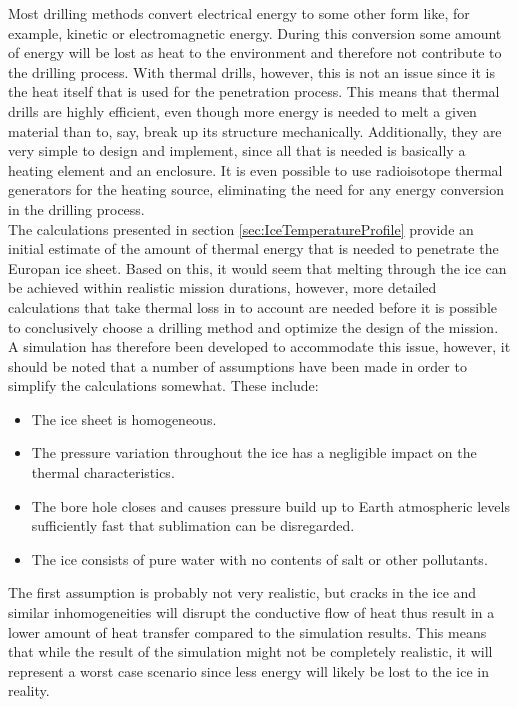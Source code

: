 \label{sec:temp_simulation}
Most drilling methods convert electrical energy to some other form like, for example, kinetic or electromagnetic energy. During this conversion some amount of energy will be lost as heat to the environment and therefore not contribute to the drilling process. With thermal drills, however, this is not an issue since it is the heat itself that is used for the penetration process. This means that thermal drills are highly efficient, even though more energy is needed to melt a given material than to, say, break up its structure mechanically. Additionally, they are very simple to design and implement, since all that is needed is basically a heating element and an enclosure. It is even possible to use radioisotope thermal generators for the heating source, eliminating the need for any energy conversion in the drilling process.\\

\noindent
The calculations presented in section \ref{sec:IceTemperatureProfile} provide an initial estimate of the amount of thermal energy that is needed to penetrate the Europan ice sheet. Based on this, it would seem that melting through the ice can be achieved within realistic mission durations, however, more detailed calculations that take thermal loss in to account are needed before it is possible to conclusively choose a drilling method and optimize the design of the mission. \\

\noindent
A simulation has therefore been developed to accommodate this issue, however, it should be noted that a number of assumptions have been made in order to simplify the calculations somewhat. These include:
\begin{itemize}
	\item The ice sheet is homogeneous.
	\item The pressure variation throughout the ice has a negligible impact on the thermal characteristics.
	\item The bore hole closes and causes pressure build up to Earth atmospheric levels sufficiently fast that sublimation can be disregarded.
	\item The ice consists of pure water with no contents of salt or other pollutants.
\end{itemize}
The first assumption is probably not very realistic, but cracks in the ice and similar inhomogeneities will disrupt the conductive flow of heat thus result in a lower amount of heat transfer compared to the simulation results. This means that while the result of the simulation might not be completely realistic, it will represent a worst case scenario since less energy will likely be lost to the ice in reality. \\

